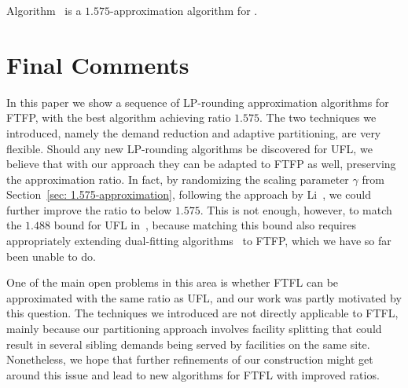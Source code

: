\documentclass[11pt]{article}
\begin{document}
\begin{theorem}\label{thm:ebgs}
  Algorithm~{\EBGS} is a $1.575$-approximation algorithm for \FTFP.
\end{theorem}






\section{Final Comments}

In this paper we show a sequence of LP-rounding approximation algorithms
for FTFP, with the best algorithm achieving  ratio $1.575$. The two techniques we introduced,
namely the demand reduction and adaptive partitioning, are very flexible. Should any new
LP-rounding algorithms be discovered for UFL, we believe that with our approach they can be
adapted to FTFP as well, preserving the approximation ratio. In fact, by randomizing the
scaling parameter $\gamma$ from Section~\ref{sec: 1.575-approximation},
following the approach by Li~\cite{Li11}, we
could further improve the ratio to below $1.575$. This is not enough, however, to
match the $1.488$ bound for UFL in~\cite{Li11}, because matching this bound
also requires appropriately extending dual-fitting algorithms~\cite{MahdianYZ06}
to FTFP, which we have so far been unable to do.

One of the main open problems in this area is whether FTFL can be approximated with the
same ratio as UFL, and our work was partly motivated by this question. The techniques we
introduced are not directly applicable to FTFL, mainly because our partitioning
approach involves facility splitting that could result in several sibling demands being served
by facilities on the same site. Nonetheless, we hope that further refinements of 
our construction might get around this issue and
lead to new algorithms for FTFL with improved ratios.

\vfill
\eject





\appendix
\end{document}
